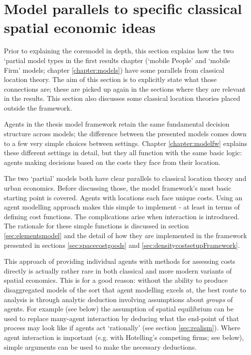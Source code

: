 \section{Model parallels to specific classical spatial economic ideas \label{sec:litbits}}

Prior to explaining the \gls{coremodel} in depth, this section explains how the two `partial model types in the first results chapter (`mobile People' and `mobile Firm' models; chapter \ref{chapter:models}) have some parallels from classical location theory. The aim of this section is to explicitly state what those connections are; these are picked up again in the sections where they are relevant in the results. This section also discusses some classical location theories placed outside the framework.

Agents in the thesis model framework retain the same fundamental decision structure across models; the difference between the presented models comes down to a few very simple choices between settings. Chapter \ref{chapter:modelfw} explains these different settings in detail, but they all function with the same basic logic: agents making decisions based on the costs they face from their location.

The two `partial' models both have clear parallels to classical location theory and urban economics. Before discussing those, the model framework's most basic starting point is covered. Agents with locations each face unique costs. Using an agent modelling approach makes this simple to implement - at least in terms of defining cost functions. The complications arise when interaction is introduced. The rationale for these simple functions is discussed in section \ref{sec:elementsmodel} and the detail of how they are implemented in the framework presented in sections \ref{sec:spacecostgoods} and \ref{sec:densitycostsetupFramework}.

This approach of providing individual agents with methods for assessing costs directly is actually rather rare in both classical and more modern variants of spatial economics. This is for a good reason: without the ability to produce disaggregated models of the sort that agent modelling excels at, the best route to analysis is through analytic deduction involving assumptions about \emph{groups} of agents. For example (see below) the assumption of spatial equilibrium can be used to replace many-agent interaction by deducing what the end-point of that process may look like if agents act `rationally' (see section \ref{sec:realism}). Where agent interaction is important (e.g. with Hotelling's competing firms; see below), simple arguments can be used to make the necessary deductions. 

